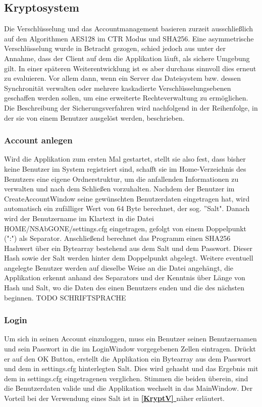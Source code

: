 \documentclass[13pt,a4paper,bibliography=totocnumbered,listof=totocnumbered]{scrartcl}
\newcommand*{\fullref}[1]{\textbf{\hyperref[{#1}]{\ref*{#1} \nameref*{#1}}}}
\begin{document}
\subsection{Kryptosystem}
Die Verschlüsselung und das Accountmanagement basieren zurzeit ausschließlich auf den Algorithmen AES128 im CTR Modus und SHA256. Eine asymmetrische Verschlüsselung wurde in Betracht gezogen, schied jedoch aus unter der Annahme, dass der Client auf dem die Applikation läuft, als sichere Umgebung gilt. In einer späteren Weiterentwicklung ist es aber durchaus sinnvoll dies erneut zu evaluieren. Vor allem dann, wenn ein Server das Dateisystem bzw. dessen Synchronität verwalten oder mehrere kaskadierte Verschlüsselungsebenen geschaffen werden sollen, um eine erweiterte Rechteverwaltung zu ermöglichen. Die Beschreibung der Sicherungsverfahren wird nachfolgend in der Reihenfolge, in der sie von einem Benutzer ausgelöst werden, beschrieben.
\subsubsection{Account anlegen}
Wird die Applikation zum ersten Mal gestartet, stellt sie also fest, dass bisher keine Benutzer im System registriert sind, schafft sie im Home-Verzeichnis des Benutzers eine eigene Ordnerstruktur, um die anfallenden Informationen zu verwalten und nach dem Schließen vorzuhalten. Nachdem der Benutzer im CreateAccountWindow seine gewünschten Benutzerdaten eingetragen hat, wird automatisch ein zufälliger Wert von 64 Byte berechnet, der sog. ''Salt". Danach wird der Benutzername im Klartext in die Datei HOME/NSAbGONE/settings.cfg eingetragen, gefolgt von einem Doppelpunkt (":") als Separator. Anschließend berechnet das Programm einen SHA256 Hashwert über ein Bytearray bestehend aus dem Salt und dem Passwort. Dieser Hash sowie der Salt werden hinter dem Doppelpunkt abgelegt. Weitere eventuell angelegte Benutzer werden auf dieselbe Weise an die Datei angehängt, die Applikation erkennt anhand des Separators und der Kenntnis über Länge von Hash und Salt, wo die Daten des einen Benutzers enden und die des nächsten beginnen. TODO SCHRIFTSPRACHE
\subsubsection{Login}
Um sich in seinen Account einzuloggen, muss ein Benutzer seinen Benutzernamen und sein Passwort in die im LoginWindow vorgegebenen Zellen eintragen. Drückt er auf den OK Button, erstellt die Applikation ein Bytearray aus dem Passwort und dem in settings.cfg hinterlegten Salt. Dies wird gehasht und das Ergebnis mit dem in settings.cfg eingetragenen verglichen. Stimmen die beiden überein, sind die Benutzerdaten valide und die Applikation wechselt in das MainWindow. Der Vorteil bei der Verwendung eines Salt ist in \fullref{KryptV} näher erläutert.
\end{document}
